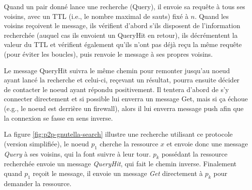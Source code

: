 Quand un pair donné lance une recherche (Query), il envoie sa requête à tous ses voisins, avec un TTL (i.e., le nombre maximal de sauts) fixé à $n$. Quand les voisins reçoivent le message, ils vérifient d'abord s'ils disposent de l'information recherchée (auquel cas ils envoient un QueryHit en retour), ils décrémentent la valeur du TTL et vérifient également qu'ils n'ont pas déjà reçu la même requête (pour éviter les boucles), puis renvoie le message à ses propres voisins.

Le message QueryHit suivra le même chemin pour remonter jusqu'au noeud ayant lancé la recherche et celui-ci, reçevant un résultat, pourra ensuite décider de contacter le noeud ayant répondu positivement. Il tentera d'abord de s'y connecter directement et si possible lui enverra un message Get, mais si ça échoue (e.g., le noeud est derrière un firewall), alors il lui enverra message push afin que la connexion se fasse en sens inverse.

La figure \ref{fig:p2p-gnutella-search} illustre une recherche utilisant ce protocole (version simplifiée), le noeud $p_1$ cherche la ressource $x$ et envoie donc une message \textit{Query} à ses voisins, qui la font suivre à leur tour. $p_k$ possédant la ressource recherchée envoie un message \textit{QueryHit}, qui fait le chemin inverse. Finalement quand $p_1$ reçoit le message, il envoie un message \textit{Get} directement à $p_k$ pour demander la ressource.

